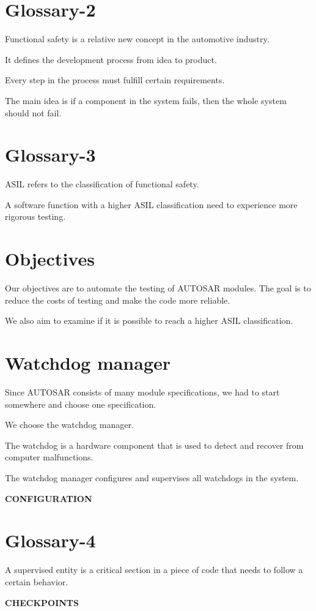 \documentclass[a4paper]{article}
\begin{document}
\section{Glossary-2}
Functional safety is a relative new concept in the automotive
industry.

It defines the development process from idea to product.

Every step in the process must fulfill certain requirements.

The main idea is if a component in the system fails, then the whole
system should not fail.

\section{Glossary-3}
ASIL refers to the classification of functional safety.

A software function with a higher ASIL classification need to
experience more rigorous testing.

\section{Objectives}
Our objectives are to automate the testing of AUTOSAR modules. The
goal is to reduce the costs of testing and make the code more
reliable.

We also aim to examine if it is possible to reach a higher ASIL classification.

\section{Watchdog manager}
Since AUTOSAR consists of many module specifications, we had to start
somewhere and choose one specification.

We choose the watchdog manager.

The watchdog is a hardware component that is used to detect and
recover from computer malfunctions.

The watchdog manager configures and supervises all watchdogs in the
system.

\textbf{CONFIGURATION}

\section{Glossary-4}
A supervised entity is a critical section in a piece of code that
needs to follow a certain behavior.

\textbf{CHECKPOINTS}
\end{document}
